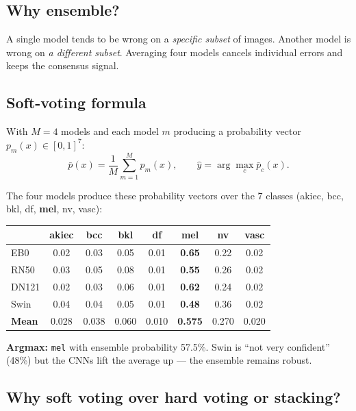 \documentclass[11pt,a4paper]{article}
\begin{document}
\subsection{Why ensemble?}

\begin{simple}
A single model tends to be wrong on a \textit{specific subset} of images. Another model is wrong on \textit{a different subset}. Averaging four models cancels individual errors and keeps the consensus signal.
\end{simple}

\subsection{Soft-voting formula}

With $M = 4$ models and each model $m$ producing a probability vector $p_m(x) \in [0,1]^7$:
\[
  \bar{p}(x) = \frac{1}{M} \sum_{m=1}^{M} p_m(x), \qquad \hat{y} = \arg\max_c \bar{p}_c(x).
\]

\begin{example}
The four models produce these probability vectors over the 7 classes (akiec, bcc, bkl, df, \textbf{mel}, nv, vasc):

\small
\begin{tabular}{lccccccc}
\toprule
& akiec & bcc & bkl & df & \textbf{mel} & nv & vasc \\
\midrule
EB0    & 0.02 & 0.03 & 0.05 & 0.01 & \textbf{0.65} & 0.22 & 0.02 \\
RN50   & 0.03 & 0.05 & 0.08 & 0.01 & \textbf{0.55} & 0.26 & 0.02 \\
DN121  & 0.02 & 0.03 & 0.06 & 0.01 & \textbf{0.62} & 0.24 & 0.02 \\
Swin   & 0.04 & 0.04 & 0.05 & 0.01 & \textbf{0.48} & 0.36 & 0.02 \\
\midrule
\textbf{Mean} & 0.028 & 0.038 & 0.060 & 0.010 & \textbf{0.575} & 0.270 & 0.020 \\
\bottomrule
\end{tabular}
\normalsize

\textbf{Argmax:} \texttt{mel} with ensemble probability 57.5\%. Swin is ``not very confident'' (48\%) but the CNNs lift the average up --- the ensemble remains robust.
\end{example}

\subsection{Why soft voting over hard voting or stacking?}
\end{document}

